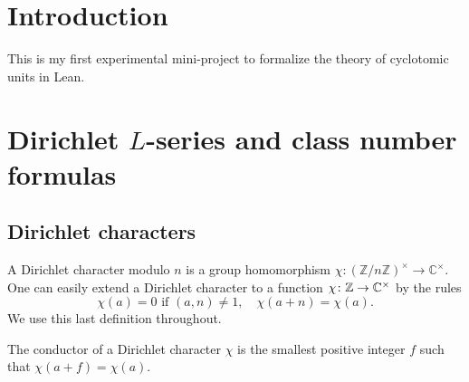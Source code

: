 %

\chapter{Introduction}
This is my first experimental mini-project 
to formalize the theory of cyclotomic units in Lean. 


\chapter{Dirichlet $L$-series and class number formulas}\label{chap:dirichlet}

\section{Dirichlet characters}

\begin{definition}\label{defn:dirichlet_character}
    \leanok
    A Dirichlet character modulo $n$ is a group homomorphism $\chi \colon (\mathbb{Z} / n \mathbb{Z})^\times \to \mathbb{C}^\times$. One can easily extend a Dirichlet character 
    to a function $\chi \colon \mathbb{Z} \rightarrow \mathbb{C}^\times$ by the rules 
    $$
    \chi(a) = 0 \text{ if } (a, n) \ne 1, \quad \chi(a + n) = \chi(a).
    $$
    We use this last definition throughout.
\end{definition}


\begin{definition}\label{defn:conductor_dirchar}
    \leanok
    The conductor of a Dirichlet character $\chi$ is the smallest positive integer $f$ such that $\chi(a + f) = \chi(a)$.
\end{definition}

